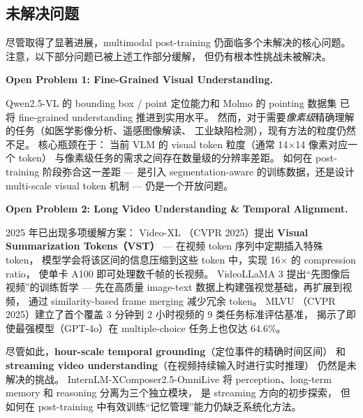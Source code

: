 \subsection{未解决问题}
\label{sec:t5-open}

尽管取得了显著进展，multimodal post-training 仍面临多个未解决的核心问题。
注意，以下部分问题已被上述工作部分缓解，
但仍有根本性挑战未被解决。

\begin{openproblembox}
\textbf{Open Problem 1: Fine-Grained Visual Understanding.}

Qwen2.5-VL 的 bounding box / point 定位能力和 Molmo 的 pointing 数据集
已将 fine-grained understanding 推进到实用水平。
然而，对于需要\textit{像素级}精确理解的任务（如医学影像分析、遥感图像解读、
工业缺陷检测），现有方法的粒度仍然不足。
核心瓶颈在于：
当前 VLM 的 visual token 粒度（通常 14$\times$14 像素对应一个 token）
与像素级任务的需求之间存在数量级的分辨率差距。
如何在 post-training 阶段弥合这一差距 ---
是引入 segmentation-aware 的训练数据，还是设计 multi-scale visual token 机制 ---
仍是一个开放问题。
\end{openproblembox}

\begin{openproblembox}
\textbf{Open Problem 2: Long Video Understanding \& Temporal Alignment.}

2025 年已出现多项缓解方案：
Video-XL \cite{shu2024videoxl}（CVPR 2025）提出 \textbf{Visual Summarization Tokens（VST）} ---
在视频 token 序列中定期插入特殊 token，
模型学会将该区间的信息压缩到这些 token 中，实现 16$\times$ 的 compression ratio，
使单卡 A100 即可处理数千帧的长视频。
VideoLLaMA 3 \cite{zhang2025videollama3} 提出``先图像后视频''的训练哲学 ---
先在高质量 image-text 数据上构建强视觉基础，再扩展到视频，
通过 similarity-based frame merging 减少冗余 token。
MLVU \cite{zhou2024mlvu}（CVPR 2025）建立了首个覆盖 3 分钟到 2 小时视频的
9 类任务标准评估基准，
揭示了即使最强模型（GPT-4o）在 multiple-choice 任务上也仅达 64.6\%。

尽管如此，\textbf{hour-scale temporal grounding}（定位事件的精确时间区间）
和 \textbf{streaming video understanding}（在视频持续输入时进行实时推理）
仍然是未解决的挑战。
InternLM-XComposer2.5-OmniLive \cite{chen2024omnilive}
将 perception、long-term memory 和 reasoning 分离为三个独立模块，
是 streaming 方向的初步探索，
但如何在 post-training 中有效训练``记忆管理''能力仍缺乏系统化方法。
\end{openproblembox}

